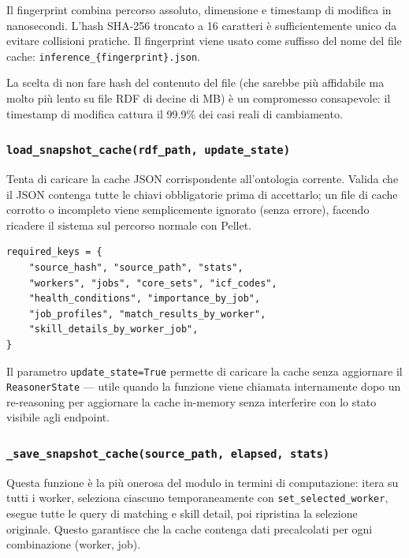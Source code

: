 \documentclass[a4paper,12pt]{article}
\begin{document}
\noindent Il fingerprint combina percorso assoluto, dimensione e timestamp di
modifica in nanosecondi. L'hash SHA-256 troncato a 16 caratteri \`{e}
sufficientemente unico da evitare collisioni pratiche. Il fingerprint
viene usato come suffisso del nome del file cache:
\texttt{inference\_\{fingerprint\}.json}.

La scelta di non fare hash del contenuto del file (che sarebbe pi\`{u}
affidabile ma molto pi\`{u} lento su file RDF di decine di MB) \`{e}
un compromesso consapevole: il timestamp di modifica cattura il 99.9\%
dei casi reali di cambiamento.

\subsubsection{\texttt{load\_\allowbreak{}snapshot\_\allowbreak{}cache(rdf\_\allowbreak{}path, update\_\allowbreak{}state)}}

Tenta di caricare la cache JSON corrispondente all'ontologia corrente.
Valida che il JSON contenga tutte le chiavi obbligatorie prima di
accettarlo; un file di cache corrotto o incompleto viene semplicemente
ignorato (senza errore), facendo ricadere il sistema sul percorso normale
con Pellet.

\begin{lstlisting}[caption={Chiavi obbligatorie nella snapshot cache.}]
required_keys = {
    "source_hash", "source_path", "stats",
    "workers", "jobs", "core_sets", "icf_codes",
    "health_conditions", "importance_by_job",
    "job_profiles", "match_results_by_worker",
    "skill_details_by_worker_job",
}
\end{lstlisting}

\noindent Il parametro \texttt{update\_state=True} permette di caricare la cache
senza aggiornare il \texttt{ReasonerState} --- utile quando la funzione
viene chiamata internamente dopo un re-reasoning per aggiornare la cache
in-memory senza interferire con lo stato visibile agli endpoint.

\subsubsection{\texttt{\_\allowbreak{}save\_\allowbreak{}snapshot\_\allowbreak{}cache(source\_\allowbreak{}path, elapsed, stats)}}

Questa funzione \`{e} la pi\`{u} onerosa del modulo in termini di
computazione: itera su tutti i worker, seleziona ciascuno temporaneamente
con \texttt{set\_selected\_worker}, esegue tutte le query di matching e
skill detail, poi ripristina la selezione originale. Questo garantisce
che la cache contenga dati precalcolati per ogni combinazione (worker,
job).
\end{document}
